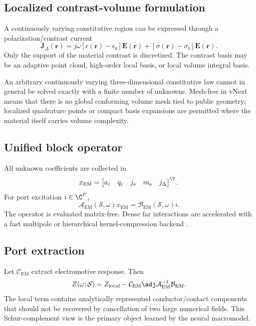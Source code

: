 \subsection{Localized contrast-volume formulation}

A continuously varying constitutive region can be expressed through a
polarization/contrast current
\[
  \mathbf J_\Delta(\mathbf r)
  =
  j\omega[\epsilon(\mathbf r)-\epsilon_b]\mathbf E(\mathbf r)
  +[\sigma(\mathbf r)-\sigma_b]\mathbf E(\mathbf r).
\]
Only the support of the material contrast is discretized. The contrast basis
may be an adaptive point cloud, high-order local basis, or local volume
integral basis.

\begin{principle}
An arbitrary continuously varying three-dimensional constitutive law cannot in
general be solved exactly with a finite number of unknowns. Mesh-free in vNext
means that there is no global conforming volume mesh tied to public geometry;
localized quadrature points or compact basis expansions are permitted where the
material itself carries volume complexity.
\end{principle}

\subsection{Unified block operator}

All unknown coefficients are collected in
\[
  x_{\mathrm{EM}}
 =
 \begin{bmatrix}
  a_c & q_c & j_s & m_s & j_\Delta
 \end{bmatrix}^{\T}.
\]
For port excitation $i\in\C^P$,
\[
 \mathcal A_{\mathrm{EM}}(\mathcal S,\omega)
 x_{\mathrm{EM}}
 =
 \mathcal B_{\mathrm{EM}}(\mathcal S,\omega)i.
\]
The operator is evaluated matrix-free. Dense far interactions are accelerated
with a fast multipole or hierarchical kernel-compression backend
\cite{greengard1987fmm,hackbusch2015hierarchical}.

\subsection{Port extraction}

Let $\mathcal C_{\mathrm{EM}}$ extract electromotive response. Then
\[
  Z(\omega;\mathcal S)
 =
  Z_{\mathrm{local}}
  -\mathcal C_{\mathrm{EM}}\adj
   \mathcal A_{\mathrm{EM}}^{-1}
   \mathcal B_{\mathrm{EM}}.
\]
The local term contains analytically represented conductor/contact components
that should not be recovered by cancellation of two large numerical fields.
This Schur-complement view is the primary object learned by the neural
macromodel.

